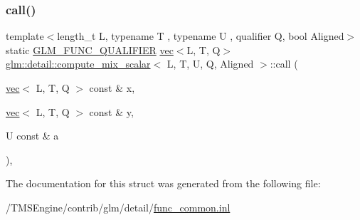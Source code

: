 \subsubsection{\texorpdfstring{call()}{call()}}
{\footnotesize\ttfamily template$<$length\+\_\+t L, typename T , typename U , qualifier Q, bool Aligned$>$ \\
static \hyperlink{setup_8hpp_a33fdea6f91c5f834105f7415e2a64407}{G\+L\+M\+\_\+\+F\+U\+N\+C\+\_\+\+Q\+U\+A\+L\+I\+F\+I\+ER} \hyperlink{structglm_1_1vec}{vec}$<$L, T, Q$>$ \hyperlink{structglm_1_1detail_1_1compute__mix__scalar}{glm\+::detail\+::compute\+\_\+mix\+\_\+scalar}$<$ L, T, U, Q, Aligned $>$\+::call (\begin{DoxyParamCaption}\item[{\hyperlink{structglm_1_1vec}{vec}$<$ L, T, Q $>$ const \&}]{x,  }\item[{\hyperlink{structglm_1_1vec}{vec}$<$ L, T, Q $>$ const \&}]{y,  }\item[{U const \&}]{a }\end{DoxyParamCaption})\hspace{0.3cm}{\ttfamily [inline]}, {\ttfamily [static]}}



The documentation for this struct was generated from the following file\+:\begin{DoxyCompactItemize}
\item 
/\+T\+M\+S\+Engine/contrib/glm/detail/\hyperlink{func__common_8inl}{func\+\_\+common.\+inl}\end{DoxyCompactItemize}

